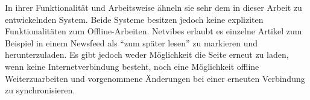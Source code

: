 In ihrer Funktionalität und Arbeitsweise ähneln sie sehr dem in dieser Arbeit zu entwickelnden System. Beide Systeme besitzen jedoch keine expliziten Funktionalitäten zum Offline-Arbeiten. Netvibes erlaubt es einzelne Artikel zum Beispiel in einem Newsfeed als "`zum später lesen"' zu markieren und herunterzuladen. Es gibt jedoch weder Möglichkeit die Seite erneut zu laden, wenn keine Internetverbindung besteht, noch eine Möglichkeit offline Weiterzuarbeiten und vorgenommene Änderungen bei einer erneuten Verbindung zu synchronisieren. 